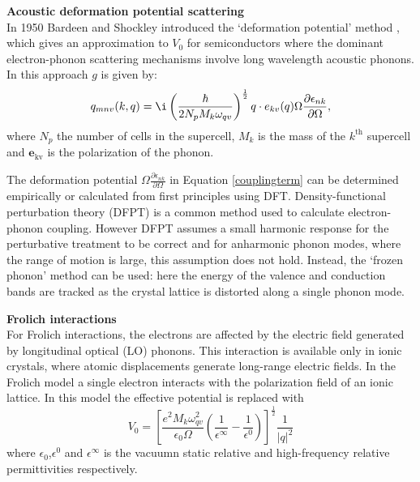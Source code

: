 \textbf{Acoustic deformation potential scattering}\\
 In 1950 Bardeen and Shockley introduced the `deformation potential' method \cite{}, which gives an approximation to $V_0$ for semiconductors where the dominant electron-phonon scattering mechanisms involve long wavelength acoustic phonons.\cite{Giustino2017} In this approach $g$ is given by:
\begin{equation} \label{couplingterm}  %
   q_{mnv}(k,q) = \i\left(\frac{\hbar}{2N_pM_k\omega_{qv}}\right)^{\frac{1}{2}}q\cdot e_{kv}(q) \Omega\frac{\partial\epsilon_{nk}}{\partial\Omega},
\end{equation}
where $N_p$ the number of cells in the supercell, $M_k$ is the mass of the $k^{\textrm{th}}$ supercell and $\textbf{e}_\textrm{{kv}}$ is the polarization of the phonon. 

The deformation potential $\Omega\frac{\partial\epsilon_{nk}}{\partial\Omega}$ in Equation \ref{couplingterm} can be determined empirically or calculated from first principles using DFT. 
Density-functional perturbation theory (DFPT) is a common method used to calculate  electron-phonon  coupling. However DFPT assumes a small harmonic response for the perturbative treatment to be correct and for anharmonic phonon modes, where the range of motion is large, this assumption does not hold.
Instead, the `frozen phonon' method can be used: here the energy of the valence and conduction bands are tracked as the crystal lattice is distorted along a single phonon mode. 

\textbf{Frolich interactions}\\
For Frolich interactions, the electrons are affected by the electric field generated by longitudinal optical (LO) phonons.
This interaction is available only in ionic crystals, where atomic displacements generate long-range electric fields. In the Frolich model a single electron interacts with the polarization field of an ionic lattice.\cite{Giustino2017}
In this model the effective potential is replaced with
\begin{equation}
    V_0 = \left[\frac{e^2M_k\omega^2_{qv}}{\epsilon_0\Omega}\left(\frac{1}{\epsilon^{\infty}}-\frac{1}{\epsilon^0}\right)\right]^{\frac{1}{2}}\frac{1}{|q|^2}
\end{equation}
where $\epsilon_0$,$\epsilon^0$ and $\epsilon^{\infty}$ is the vacuumn static relative and high-frequency relative permittivities respectively.

